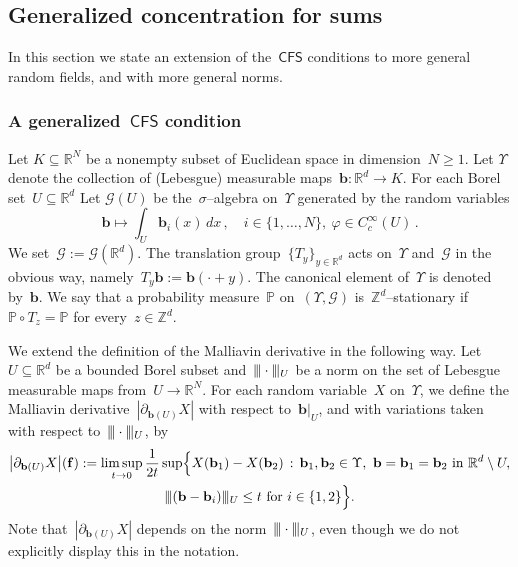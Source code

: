 \documentclass[11pt]{article} %
\numberwithin{equation}{section}
\theoremstyle{definition}
\let\originalleft\left
\let\originalright\right
\renewcommand{\left}{\mathopen{}\mathclose\bgroup\originalleft}
\renewcommand{\right}{\aftergroup\egroup\originalright}
\newcommand{\vertiii}{\vert\kern-0.3ex\vert\kern-0.25ex\vert}
\newcommand*{\R}{\ensuremath{\mathbb{R}}}
\newcommand*{\Zd}{\ensuremath{\mathbb{Z}^d}}
\newcommand*{\Rd}{\ensuremath{\mathbb{R}^d}}
\renewcommand{\b}{\ensuremath{\mathbf{b}}}
\newcommand{\f}{\mathbf{f}}
\renewcommand{\P}{\mathbb{P}}
\newcommand{\CFS}{\mathsf{CFS}}
\begin{document}
\subsection{Generalized concentration for sums}
\label{s.closure}

In this section we state an extension of the~$\CFS$ conditions to more general random fields, and with more general norms.

\smallskip

\subsubsection{A generalized~$\CFS$ condition}
\label{ss.CFS.gen}

Let $K \subseteq \R^{N}$ be a nonempty subset of Euclidean space in dimension~$N\geq 1$. Let $\Upsilon$ denote the collection of (Lebesgue) measurable maps~$\b:\Rd \to K$. For each Borel set~$U\subseteq \Rd$ Let $\mathcal{G}(U)$ be the~$\sigma$--algebra on~$\Upsilon$ generated by the random variables \begin{equation*}
\b \mapsto \int_{U} \b_i(x) \,dx \,, \quad i \in \{1,\ldots,N\}, \ \varphi\in C^\infty_c(U)\,.
\end{equation*}
We set~$\mathcal{G}:=\mathcal{G}(\Rd)$.
The translation group~$\{ T_y \}_{y\in\Rd}$ acts on~$\Upsilon$ and~$\mathcal{G}$ in the obvious way, namely~$T_y\b := \b(\cdot+y)$. 
The canonical element of~$\Upsilon$ is denoted by~$\b$. 
We say that a probability measure~$\P$ on~$(\Upsilon,\mathcal{G})$ is~$\Zd$--stationary if~$\P\circ T_z = \P$ for every~$z\in\Zd$. 

\smallskip

We extend the definition of the Malliavin derivative in the following way. 
Let~$U\subseteq\Rd$ be a bounded Borel subset and~$\vertiii \cdot \vertiii_U$ be a norm on the set of Lebesgue measurable maps from~$U \to \R^N$. 
For each random variable~$X$ on~$\Upsilon$, we define the Malliavin derivative~$|\partial_{\b(U)} X|$ with respect to~$\b\vert_U$, and with variations taken with respect to~$\vertiii \cdot \vertiii_U$, by
\begin{multline} 
\label{e.Mall.Maul.yes}
\left| \partial_{\b(U)} X\right| (\f) 
:=
\limsup_{t\to 0} 
\frac1{2t} 
\sup
\Bigl\{ X(\b_1) - X(\b_2) 
\,:\,
\b_1,\b_2 \in\Upsilon, \ \b = \b_1 = \b_2 \ \mbox{in} \ \Rd\setminus U, 
\\
\vertiii (\b - \b_i) \vertiii_U \leq t  \ \mbox{for} \ i\in\{1,2\}
\Bigr\}.
\end{multline}
Note that~$|\partial_{\b(U)} X|$ depends on the norm~$\vertiii \cdot \vertiii_U$, even though we do not explicitly display this in the notation. 
\end{document}
